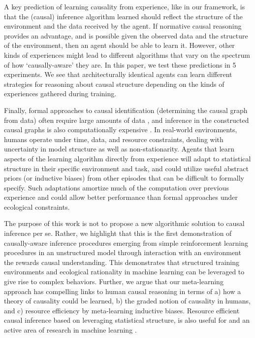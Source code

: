 A key prediction of learning causality from experience, like in our framework, is that the (causal) inference algorithm learned should reflect the structure of the environment and the data received by the agent. If normative causal reasoning provides an advantage, and is possible given the observed data and the structure of the environment, then an agent should be able to learn it. However, other kinds of experiences might lead to different algorithms that vary on the spectrum of how `causally-aware' they are. In this paper, we test these predictions in 5 experiments. We see that architecturally identical agents can learn different strategies for reasoning about causal structure depending on the kinds of experiences gathered during training. 

Finally, formal approaches to causal identification (determining the causal graph from data) often require large amounts of data \citep{geiger1990identifying,spirtes2000causation,verma1991equivalence}, and inference in the constructed causal graphs is also computationally expensive \citep{jordan2002graphical}. In real-world environments, humans operate under time, data, and resource constraints, dealing with uncertainty in model structure as well as non-stationarity. Agents that learn aspects of the learning algorithm directly from experience will adapt to statistical structure in their specific environment and task, and could utilize useful abstract priors (or inductive biases) from other episodes that can be difficult to formally specify. Such adaptations amortize much of the computation over previous experience and could allow better performance than formal approaches under ecological constraints\citep{dasgupta2019theory,gershman2015computational,gigerenzer2009homo,lieder2017strategy,todd2007environments}.  

The purpose of this work is not to propose a new algorithmic solution to causal inference per se. Rather, we highlight that this is the first demonstration of causally-aware inference procedures emerging from simple reinforcement learning procedures in an unstructured model through interaction with an environment the rewards causal understanding. This demonstrates that structured training environments and ecological rationality in machine learning can be leveraged to give rise to complex behaviors. Further, we argue that our meta-learning approach has compelling links to human causal reasoning in terms of a) how a theory of causality could be learned, b) the graded notion of causality in humans, and c) resource efficiency by meta-learning inductive biases. Resource efficient causal inference based on leveraging statistical structure, is also useful for and an active area of research in machine learning \citep[e.g.][]{bengio2019meta, heckerman1995learning,magliacane2018domain,parascandolo2017learning,mitrovic2018causal}.

